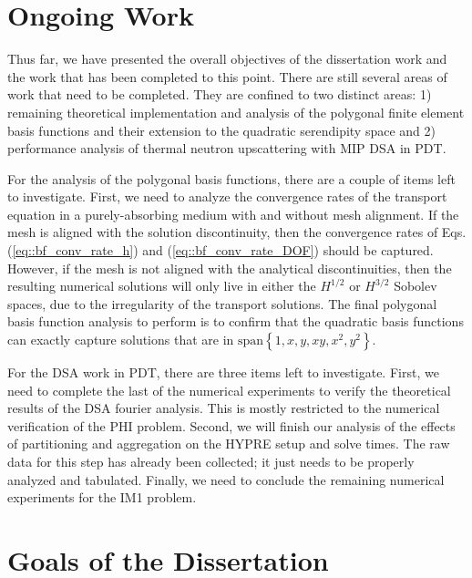 \documentclass[11pt]{article}
\begin{document}
\section{Ongoing Work}
\label{sec::OW}

Thus far, we have presented the overall objectives of the dissertation work and the work that has been completed to this point. There are still several areas of work that need to be completed. They are confined to two distinct areas: 1) remaining theoretical implementation and analysis of the polygonal finite element basis functions and their extension to the quadratic serendipity space and 2) performance analysis of thermal neutron upscattering with  MIP DSA in PDT.

For the analysis of the polygonal basis functions, there are a couple of items left to investigate. First, we need to analyze the convergence rates of the transport equation in a purely-absorbing medium with and without mesh alignment. If the mesh is aligned with the solution discontinuity, then the convergence rates of Eqs. (\ref{eq::bf_conv_rate_h}) and (\ref{eq::bf_conv_rate_DOF}) should be captured. However, if the mesh is not aligned with the analytical discontinuities, then the resulting numerical solutions will only live in either the $H^{1/2}$ or $H^{3/2}$ Sobolev spaces, due to the irregularity of the transport solutions. The final polygonal basis function analysis to perform is to confirm that the quadratic basis functions can exactly capture solutions that are in $\text{span}\left\{  1,x,y,xy,x^2,y^2  \right\}$.

For the DSA work in PDT, there are three items left to investigate. First, we need to complete the last of the numerical experiments to verify the theoretical results of the DSA fourier analysis. This is mostly restricted to the numerical verification of the PHI problem. Second, we will finish our analysis of the effects of partitioning and aggregation on the HYPRE setup and solve times. The raw data for this step has already been collected; it just needs to be properly analyzed and tabulated. Finally, we need to conclude the remaining numerical experiments for the IM1 problem.

\section{Goals of the Dissertation}
\label{sec::ER}
\end{document}
